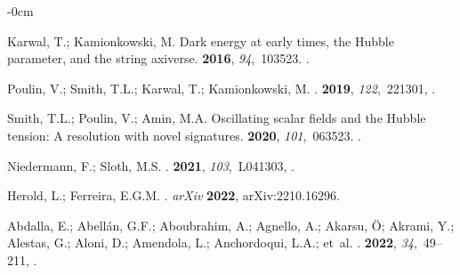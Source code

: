 \documentclass[universe,article,accept,moreauthors,pdftex]{Definitions/mdpi}
\begin{document}
\begin{adjustwidth}{-\extralength}{0cm}
\begin{thebibliography}{999}
Karwal, T.; Kamionkowski, M.
\newblock Dark energy at early times, the Hubble parameter, and the string
  axiverse.
 {\bf 2016}, {\em 94},~103523.
\newblock
{\href{https://doi.org/10.1103/PhysRevD.94.103523}{}}.

Poulin, V.; Smith, T.L.; Karwal, T.; Kamionkowski, M.
.
 {\bf 2019}, {\em 122},~221301,
{\href{https://doi.org/10.1103/PhysRevLett.122.221301}{}}.

Smith, T.L.; Poulin, V.; Amin, M.A.
\newblock Oscillating scalar fields and the Hubble tension: A resolution with
  novel signatures.
 {\bf 2020}, {\em 101},~063523.
\newblock
{\href{https://doi.org/10.1103/PhysRevD.101.063523}{}}.

Niedermann, F.; Sloth, M.S.
.
 {\bf 2021}, {\em 103},~L041303,
{\href{https://doi.org/10.1103/PhysRevD.103.L041303}{}}.

Herold, L.; Ferreira, E.G.M.
. \emph{arXiv} \textbf{2022}, arXiv:2210.16296. 

Abdalla, E.; Abellán, G.F.; Aboubrahim, A.; Agnello, A.; Akarsu, Ö; Akrami, Y.; Alestas, G.; Aloni, D.; Amendola, L.; Anchordoqui, L.A.;  et~al.
.
 {\bf 2022}, {\em 34},~49--211,
{\href{https://doi.org/10.1016/j.jheap.2022.04.002}{}}.


\end{thebibliography}
\end{adjustwidth}
\end{document}
